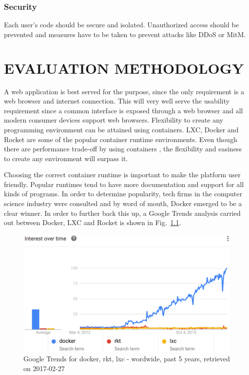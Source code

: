\documentclass[DD]{iitmdiss}
\begin{document}
\subsection{Security}
Each user's code should be secure and isolated. Unauthorized access should be prevented and measures have to be taken to prevent attacks like DDoS or MitM.

\chapter{EVALUATION METHODOLOGY}

A web application is best served for the purpose, since the only requirement is a web browser and internet connection. This will very well serve the usability requirement since a common interface is exposed through a web browser and all modern consumer devices support web browsers. Flexibility to create any programming environment can be attained using containers. LXC, Docker and Rocket are some of the popular container runtime environments. Even though there are performance trade-off by using containers \citep{ruan_performance_2016}, the flexibility and easiness to create any environment will surpass it.

Choosing the correct container runtime is important to make the platform user friendly. Popular runtimes tend to have more documentation and support for all kinds of programs. In order to determine popularity, tech firms in the computer science industry were consulted and by word of mouth, Docker emerged to be a clear winner. In order to further back this up, a Google Trends analysis carried out between Docker, LXC and Rocket \citep{google_trends_docker_lxc_rkt} is shown in Fig.~\ref{fig:google_trends_docker_rkt_lxc}. 

\begin{figure}
\centering
\includegraphics[width=0.9\linewidth]{img/google_trends_docker_rkt_lxc}
\caption[Google Trends for docker, rkt, lxc]{Google Trends for docker, rkt, lxc - wordwide, past 5 years, retrieved on 2017-02-27}
\label{fig:google_trends_docker_rkt_lxc}
\end{figure}
\end{document}
